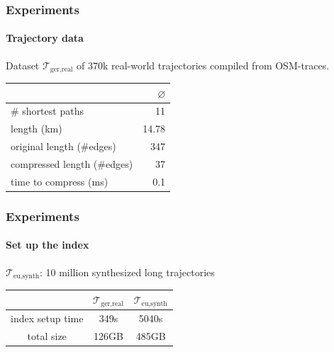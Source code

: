 \documentclass[10pt, t,
aspectratio=1610,%
usenames,
dvipsnames,
]{beamer}
\newcommand{\traj}[2]{\mathcal{T}_{\text{#1},\text{#2}}}
\begin{document}
\begin{frame}
	\frametitle{Experiments}
	\framesubtitle{Trajectory data}
	Dataset $\traj{ger}{real}$ of 370k real-world trajectories compiled from OSM-traces.
	\begin{table}
		{
			\begin{tabular}{|l|r|}
				\hline
				                            & $\varnothing$ \\
				\hline
				\# shortest paths           & 11            \\
				length (km)                 & 14.78         \\
				original length (\#edges)   & 347           \\
				compressed length (\#edges) & 37            \\
				time to compress (ms)       & 0.1           \\
				\hline
			\end{tabular}
		}
	\end{table}
\end{frame}

\begin{frame}
	\frametitle{Experiments}
	\framesubtitle{Set up the index}
	\begin{table}
		{
			$\traj{eu}{synth}$: 10 million synthesized long trajectories \pause

			\centering
			\begin{tabular}{|c|cc|}
				\hline
				                 & $\traj{ger}{real}$ & $\traj{eu}{synth}$ \\
				\hline
				index setup time & 349s               & 5040s              \\
				total size       & 126GB              & 485GB              \\
				\hline
			\end{tabular}
		}
	\end{table}
\end{frame}
\end{document}
